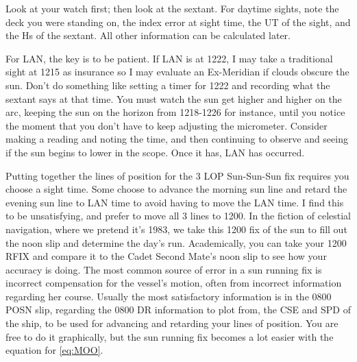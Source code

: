 \documentclass[letterpaper,12pt]{article}
\begin{document}
Look at your watch first; then look at the sextant.
For daytime sights, note the deck you were standing on, the index error at sight time, the UT of the sight, and the Hs of the sextant.
All other information can be calculated later.

For LAN, the key is to be patient. If LAN is at 1222, I may take a traditional sight at 1215 as insurance so I may evaluate an Ex-Meridian if clouds obscure the sun.
Don't do something like setting a timer for 1222 and recording what the sextant says at that time.
You must watch the sun get higher and higher on the arc, keeping the sun on the horizon from 1218-1226 for instance, until you notice the moment that you don't have to keep adjusting the micrometer.
Consider making a reading and noting the time, and then continuing to observe and seeing if the sun begins to lower in the scope.
Once it has, LAN has occurred.

Putting together the lines of position for the 3 LOP Sun-Sun-Sun fix requires you choose a sight time.
Some choose to advance the morning sun line and retard the evening sun line to LAN time to avoid having to move the LAN time.
I find this to be unsatisfying, and prefer to move all 3 lines to 1200.
In the fiction of celestial navigation, where we pretend it's 1983, we take this 1200 fix of the sun to fill out the noon slip and determine the day's run.
Academically, you can take your 1200 RFIX and compare it to the Cadet Second Mate's noon slip to see how your accuracy is doing.
The most common source of error in a sun running fix is incorrect compensation for the vessel's motion, often from incorrect information regarding her course.
Usually the most satisfactory information is in the 0800 POSN slip, regarding the 0800 DR information to plot from, the CSE and SPD of the ship, to be used for advancing and retarding your lines of position. You are free to do it graphically, but the sun running fix becomes a lot easier with the equation for \ref{eq:MOO}.
\end{document}
